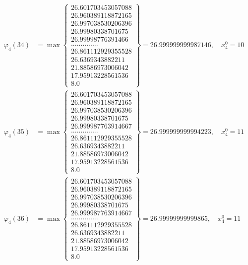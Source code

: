 \documentclass{article}
\begin{document}
\begin{align*}
  
  
  
\varphi_{4}(34) &= \max \left\{ \begin{array}{c}
26.601703453057088 \\
 26.960389118872165 \\
 26.997038530206396 \\
 26.99980338701675 \\
 26.99998776391466 \\
 .............. \\
 26.861112929355528 \\
 26.6369343882211 \\
 21.88586973006042 \\
 17.95913228561536 \\
 8.0
\end{array} \right\} = 26.999999999987146, \quad x_{4}^0 = 10\\
  
  
  
  
\varphi_{4}(35) &= \max \left\{ \begin{array}{c}
26.601703453057088 \\
 26.960389118872165 \\
 26.997038530206396 \\
 26.99980338701675 \\
 26.999987763914667 \\
 .............. \\
 26.861112929355528 \\
 26.6369343882211 \\
 21.88586973006042 \\
 17.95913228561536 \\
 8.0
\end{array} \right\} = 26.999999999994223, \quad x_{4}^0 = 11\\
  
  
  
  
\varphi_{4}(36) &= \max \left\{ \begin{array}{c}
26.601703453057088 \\
 26.960389118872165 \\
 26.997038530206396 \\
 26.99980338701675 \\
 26.999987763914667 \\
 .............. \\
 26.861112929355528 \\
 26.6369343882211 \\
 21.88586973006042 \\
 17.95913228561536 \\
 8.0
\end{array} \right\} = 26.99999999999865, \quad x_{4}^0 = 11\\
  
  
\end{align*}
\end{document}
